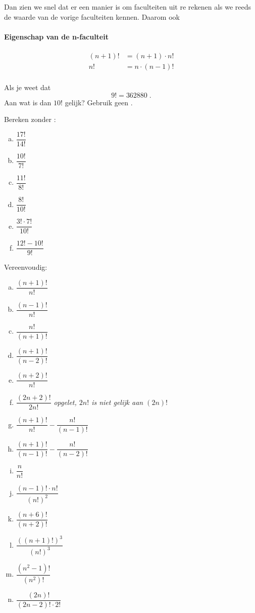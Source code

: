 \documentclass[12pt,a4paper,twoside]{article}
\begin{document}
Dan zien we snel dat er een manier is om faculteiten uit re rekenen als we reeds de waarde van de vorige faculteiten kennen. Daarom ook
\paragraph*{Eigenschap van de n-faculteit}
\begin{mdframed}
\begin{align*}
  (n+1)! &= (n+1) \cdot n!\\
  n!     &= n \cdot (n-1)!\\
\end{align*}
\end{mdframed}

\begin{oefening}
Als je weet dat
$$9!=362880\;.$$
Aan wat is dan $10!$ gelijk? Gebruik geen .
\end{oefening}

\begin{oefening}
Bereken zonder :
\begin{multicols}{3}
\begin{enumerate}[(a)]
  \itemsep.7em
  \item $\dfrac{17!}{14!}$
  \item $\dfrac{10!}{7!}$
  \item $\dfrac{11!}{8!}$
  \item $\dfrac{8!}{10!}$
  \item $\dfrac{3!\cdot 7!}{10!}$
  \item $\dfrac{12!-10!}{9!}$
\end{enumerate}
\end{multicols}
\end{oefening}

\begin{oefening}
Vereenvoudig:
\begin{multicols}{2}
\begin{enumerate}[(a)]
  \itemsep.7em
  \item $\dfrac{(n+1)!}{n!}$
  \item $\dfrac{(n-1)!}{n!}$
  \item $\dfrac{n!}{(n+1)!}$
  \item $\dfrac{(n+1)!}{(n-2)!}$
  \item $\dfrac{(n+2)!}{n!}$
  \item $\dfrac{(2n+2)!}{2n!}$ \hfill {\em\scriptsize opgelet, $2n!$ is niet gelijk aan $(2n)!$}
  \item $\dfrac{(n+1)!}{n!}-\dfrac{n!}{(n-1)!}$
  \item $\dfrac{(n+1)!}{(n-1)!}-\dfrac{n!}{(n-2)!}$
  \item $\dfrac{n}{n!}$
  \item $\dfrac{(n-1)!\cdot n!}{(n!)^2}$
  \item $\dfrac{(n+6)!}{(n+2)!}$
  \item $\dfrac{\left(\left(n+1\right)!\right)^3}{(n!)^3}$
  \item $\dfrac{(n^2-1)!}{(n^2)!}$
  \item $\dfrac{(2n)!}{(2n-2)!\cdot 2!}$
\end{enumerate}
\end{multicols}
\end{oefening}
\end{document}
